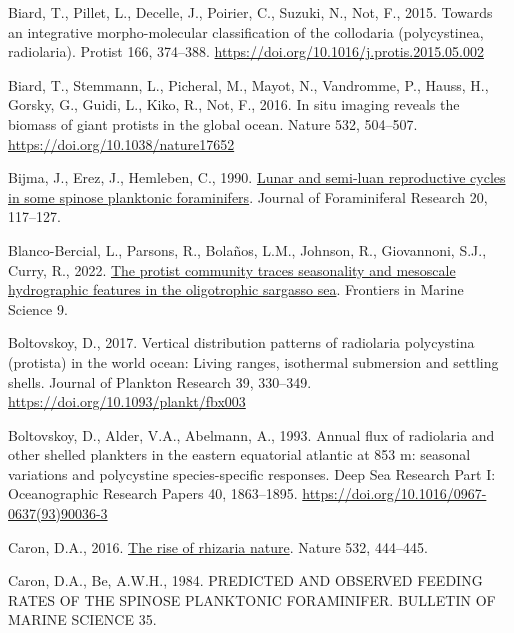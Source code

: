 \documentclass[
  letterpaper,
  DIV=11,
  numbers=noendperiod]{scrartcl}
\newlength{\cslhangindent}
\newlength{\cslentryspacingunit} %
\newenvironment{CSLReferences}[2] %
 {%
  \setlength{\parindent}{0pt}
  \ifodd #1
  \let\oldpar\par
  \def\par{\hangindent=\cslhangindent\oldpar}
  \fi
  \setlength{\parskip}{#2\cslentryspacingunit}
 }%
 {}
\begin{document}
\begin{CSLReferences}{1}{0}
\leavevmode{}%
Biard, T., Pillet, L., Decelle, J., Poirier, C., Suzuki, N., Not, F.,
2015. Towards an integrative morpho-molecular classification of the
collodaria (polycystinea, radiolaria). Protist 166, 374--388.
\url{https://doi.org/10.1016/j.protis.2015.05.002}

\leavevmode{}%
Biard, T., Stemmann, L., Picheral, M., Mayot, N., Vandromme, P., Hauss,
H., Gorsky, G., Guidi, L., Kiko, R., Not, F., 2016. In situ imaging
reveals the biomass of giant protists in the global ocean. Nature 532,
504--507. \url{https://doi.org/10.1038/nature17652}

\leavevmode{}%
Bijma, J., Erez, J., Hemleben, C., 1990.
\href{https://epic.awi.de/id/eprint/6096/1/Bij1990a.pdf}{Lunar and
semi-luan reproductive cycles in some spinose planktonic foraminifers}.
Journal of Foraminiferal Research 20, 117--127.

\leavevmode{}%
Blanco-Bercial, L., Parsons, R., Bolaños, L.M., Johnson, R., Giovannoni,
S.J., Curry, R., 2022.
\href{https://www.frontiersin.org/articles/10.3389/fmars.2022.897140}{The
protist community traces seasonality and mesoscale hydrographic features
in the oligotrophic sargasso sea}. Frontiers in Marine Science 9.

\leavevmode{}%
Boltovskoy, D., 2017. Vertical distribution patterns of radiolaria
polycystina (protista) in the world ocean: Living ranges, isothermal
submersion and settling shells. Journal of Plankton Research 39,
330--349. \url{https://doi.org/10.1093/plankt/fbx003}

\leavevmode{}%
Boltovskoy, D., Alder, V.A., Abelmann, A., 1993. Annual flux of
radiolaria and other shelled plankters in the eastern equatorial
atlantic at 853 m: seasonal variations and polycystine species-specific
responses. Deep Sea Research Part I: Oceanographic Research Papers 40,
1863--1895. \url{https://doi.org/10.1016/0967-0637(93)90036-3}

\leavevmode{}%
Caron, D.A., 2016.
\href{https://www.nature.com/articles/nature17892}{The rise of rhizaria
\textbar{} nature}. Nature 532, 444--445.

\leavevmode{}%
Caron, D.A., Be, A.W.H., 1984. PREDICTED AND OBSERVED FEEDING RATES OF
THE SPINOSE PLANKTONIC FORAMINIFER. BULLETIN OF MARINE SCIENCE 35.


\end{CSLReferences}
\end{document}

